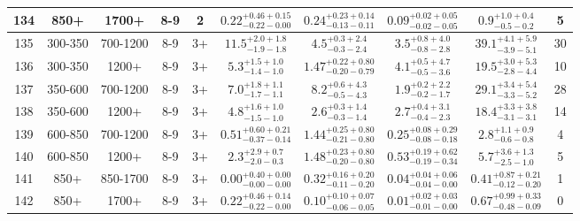 \documentclass[11pt, oneside]{article}
\begin{document}
\begin{table}
{\begin{tabular}{ |c|c|c|c|c||c|c|c||c|c| }
134 & 850+ & 1700+ & 8-9 & 2 & $0.22^{+0.46+0.15}_{-0.22-0.00}$ & $0.24^{+0.23+0.14}_{-0.13-0.11}$ & $0.09^{+0.02+0.05}_{-0.02-0.05}$ & $0.9^{+1.0+0.4}_{-0.5-0.2}$ & 5 \\ \hline
135 & 300-350 & 700-1200 & 8-9 & 3+ & $11.5^{+2.0+1.8}_{-1.9-1.8}$ & $4.5^{+0.3+2.4}_{-0.3-2.4}$ & $3.5^{+0.8+4.0}_{-0.8-2.8}$ & $39.1^{+4.1+5.9}_{-3.9-5.1}$ & 30 \\ \hline
136 & 300-350 & 1200+ & 8-9 & 3+ & $5.3^{+1.5+1.0}_{-1.4-1.0}$ & $1.47^{+0.22+0.80}_{-0.20-0.79}$ & $4.1^{+0.5+4.7}_{-0.5-3.6}$ & $19.5^{+3.0+5.3}_{-2.8-4.4}$ & 10 \\ \hline
137 & 350-600 & 700-1200 & 8-9 & 3+ & $7.0^{+1.8+1.1}_{-1.7-1.1}$ & $8.2^{+0.6+4.3}_{-0.5-4.3}$ & $1.9^{+0.2+2.2}_{-0.2-1.7}$ & $29.1^{+3.4+5.4}_{-3.3-5.2}$ & 28 \\ \hline
138 & 350-600 & 1200+ & 8-9 & 3+ & $4.8^{+1.6+1.0}_{-1.5-1.0}$ & $2.6^{+0.3+1.4}_{-0.3-1.4}$ & $2.7^{+0.4+3.1}_{-0.4-2.3}$ & $18.4^{+3.3+3.8}_{-3.1-3.1}$ & 14 \\ \hline
139 & 600-850 & 700-1200 & 8-9 & 3+ & $0.51^{+0.60+0.21}_{-0.37-0.14}$ & $1.44^{+0.25+0.80}_{-0.21-0.80}$ & $0.25^{+0.08+0.29}_{-0.08-0.18}$ & $2.8^{+1.1+0.9}_{-0.6-0.8}$ & 4 \\ \hline
140 & 600-850 & 1200+ & 8-9 & 3+ & $2.3^{+2.9+0.7}_{-2.0-0.3}$ & $1.48^{+0.23+0.80}_{-0.20-0.80}$ & $0.53^{+0.19+0.62}_{-0.19-0.34}$ & $5.7^{+3.6+1.3}_{-2.5-1.0}$ & 5 \\ \hline
141 & 850+ & 850-1700 & 8-9 & 3+ & $0.00^{+0.40+0.00}_{-0.00-0.00}$ & $0.32^{+0.16+0.20}_{-0.11-0.20}$ & $0.04^{+0.04+0.06}_{-0.04-0.00}$ & $0.41^{+0.87+0.21}_{-0.12-0.20}$ & 1 \\ \hline
142 & 850+ & 1700+ & 8-9 & 3+ & $0.22^{+0.46+0.14}_{-0.22-0.00}$ & $0.10^{+0.10+0.07}_{-0.06-0.05}$ & $0.01^{+0.02+0.03}_{-0.01-0.00}$ & $0.67^{+0.99+0.33}_{-0.48-0.09}$ & 0 \\ \hline
\end{tabular}}
\end{table}
\end{document}
